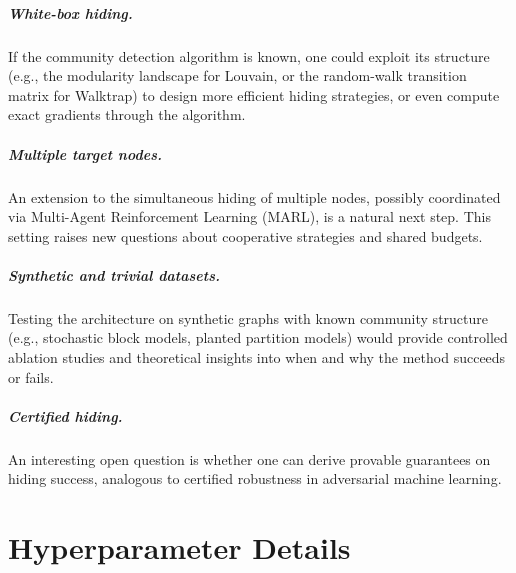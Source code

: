 \documentclass[11pt,a4paper,twoside]{tesis}
\begin{document}
\paragraph{White-box hiding.}
If the community detection algorithm is known, one could exploit its structure (e.g.,
the modularity landscape for Louvain, or the random-walk transition matrix for Walktrap)
to design more efficient hiding strategies, or even compute exact gradients through the
algorithm.

\paragraph{Multiple target nodes.}
An extension to the simultaneous hiding of multiple nodes, possibly coordinated via
Multi-Agent Reinforcement Learning (MARL), is a natural next step. This setting raises
new questions about cooperative strategies and shared budgets.

\paragraph{Synthetic and trivial datasets.}
Testing the architecture on synthetic graphs with known community structure (e.g.,
stochastic block models, planted partition models) would provide controlled ablation
studies and theoretical insights into when and why the method succeeds or fails.

\paragraph{Certified hiding.}
An interesting open question is whether one can derive provable guarantees on hiding
success, analogous to certified robustness in adversarial machine learning.


\backmatter

\printbibliography

\appendix

\chapter{Hyperparameter Details}
\label{app:hyperparams}
\end{document}
